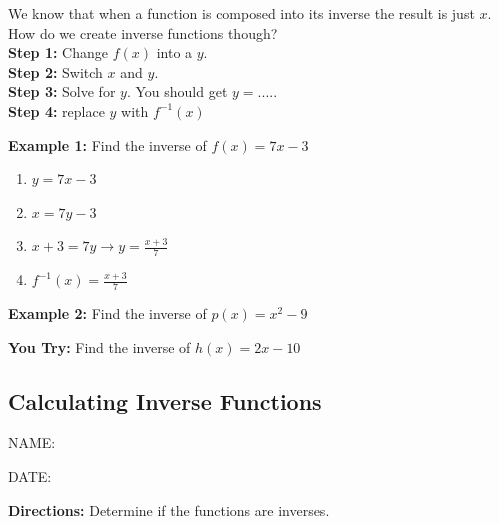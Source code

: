 \documentclass[12pt]{article}
\begin{document}
We know that when a function is composed into its inverse the result is just $x$. How do we create inverse functions though?\\

\textbf{Step 1:} Change $f(x)$ into a $y$. \\

\textbf{Step 2:} Switch $x$ and $y$.\\

\textbf{Step 3:} Solve for $y$. You should get $y=.....$\\

\textbf{Step 4:} replace $y$ with $f^{-1}(x)$\\

\hrulefill

\textbf{Example 1:} Find the inverse of $f(x)=7x-3$

\begin{enumerate}
\item $y=7x-3$\\

\item $x=7y-3$\\

\item $x+3=7y \longrightarrow y=\frac{x+3}{7}$\\

\item $f^{-1}(x)=\frac{x+3}{7}$
\end{enumerate}

\textbf{Example 2:} Find the  inverse of $p(x)=x^2-9$\\

\vspace{1 in}

\textbf{You Try:} Find the inverse of $h(x)=2x-10$\\

\clearpage

\subsection*{Calculating Inverse Functions}

\hfill NAME:\underline{\hspace{3in}}

\hfill DATE: \underline{\hspace{2in}}


\textbf{Directions:} Determine if the functions are inverses.\\
\end{document}
